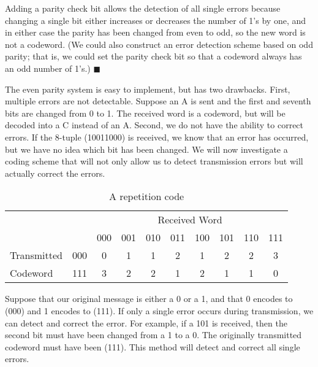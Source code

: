  
Adding a parity check bit allows the detection of all single errors
because changing a single bit either increases or decreases the number
of 1's by one, and in either case the parity has been changed from
even to odd, so the new word is not a codeword. (We could also
construct an error detection scheme based on {\bfi odd parity}; that
is, we could set the parity check bit so that a codeword always has an
odd number of 1's.)  
\hspace{\fill} $\blacksquare$
 
 
\vspace{1.5ex}
 
 
The even parity system is easy to implement, but has two drawbacks.
First, multiple errors are not detectable. Suppose an A is sent and 
the first and seventh bits are changed from 0 to 1. The received word
is a codeword, but will be decoded into a C instead of an A.
Second, we do not have the ability to correct errors.  If the 8-tuple
(10011000) is received, we know that an error has occurred, but we
have no idea which bit has been changed. We will now investigate a
coding scheme that will not only allow us to detect transmission
errors but will actually correct the errors. 
 
 
\vspace{1.5ex}
 
 
\begin{table}[htb]
\caption{A repetition code}{\small
\begin{center}
\begin{tabular}{|lc|cccccccc|}
\hline
& & \multicolumn{8}{|c|}{Received Word}    \\
            &     & 000 & 001 & 010 & 011 & 100 & 101 & 110
& 111 \\ \hline
Transmitted & 000 & 0   & 1   & 1   & 2   & 1   & 2   & 2
& 3 \\
Codeword   & 111 & 3   &  2  & 2   &  1  &  2  &   1 &  1
&  0 \\ \hline
\end{tabular}
\end{center}
}
\end{table}

 
Suppose that our original message is either a 0 or a 1, and that 0
encodes to (000) and 1 encodes to (111). If only a single
error occurs during transmission, we can detect and correct the
error. For example, if a 101 is received, then the second bit must
have been changed from a 1 to a 0.  The originally transmitted
codeword must have been (111). 	This method will detect and correct 
all single errors. 
 
